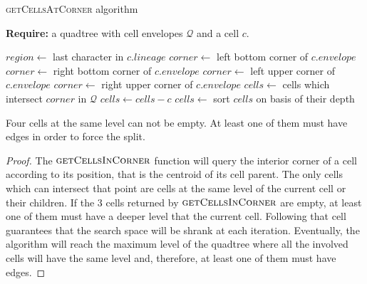     \begin{algorithm} \caption{\textsc{getCellsAtCorner} algorithm}
        \textbf{Require:} a quadtree with cell envelopes $\mathcal Q$ and a cell $c$.
        \begin{algorithmic}[1]
            \State $region \gets $ last character in $c.lineage$
                    \State $corner \gets$ left bottom corner of $c.envelope$
                \EndCase
                    \State $corner \gets$ right bottom corner of $c.envelope$
                \EndCase
                    \State $corner \gets$ left upper corner of $c.envelope$
                \EndCase
                    \State $corner \gets$ right upper corner of $c.envelope$
                \EndCase
            \EndSwitch
            \State $cells \gets$ cells which intersect $corner$ in $\mathcal Q$
            \State $cells \gets cells - c$ 
            \State $cells \gets$ sort $cells$ on basis of their depth 
            \State {}
        \EndFunction
        \end{algorithmic}
    \end{algorithm}
    
    \begin{lemma}
    Four cells at the same level can not be empty.  At least one of them must have edges in order to force the split.
    \end{lemma}
    
    \begin{proof}
    The $\textsc{getCellsInCorner}$ function will query the interior corner of a cell according to its position, that is the centroid of its cell parent.  The only cells which can intersect that point are cells at the same level of the current cell or their children.  If the 3 cells returned by $\textsc{getCellsInCorner}$ are empty, at least one of them must have a deeper level that the current cell.  Following that cell guarantees that the search space will be shrank at each iteration.  Eventually, the algorithm will reach the maximum level of the quadtree where all the involved cells will have the same level and, therefore, at least one of them must have edges.
    \end{proof}
    
